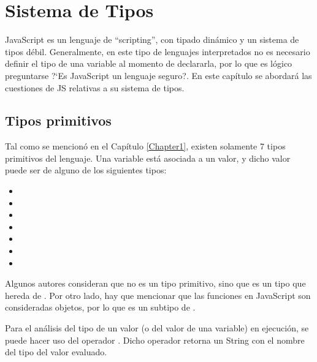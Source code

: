 
\chapter{Sistema de Tipos} %

\label{Chapter2} %


JavaScript es un lenguaje de "`scripting"', con tipado dinámico y un sistema de tipos débil. Generalmente, en este tipo de lenguajes interpretados no es necesario definir el tipo de una variable al momento de declararla, por lo que es lógico preguntarse ?`Es JavaScript un lenguaje seguro?. En este capítulo se abordará las cuestiones de JS relativas a su sistema de tipos.


\section{Tipos primitivos}

Tal como se mencionó en el Capítulo \ref{Chapter1}, existen solamente 7 tipos primitivos del lenguaje. Una variable está asociada a un valor, y dicho valor puede ser de alguno de los siguientes tipos:

\begin{itemize}
\item {}
\item {}
\item {}
\item {}
\item {}
\item {}
\item {}
\end{itemize}

Algunos autores consideran que  no es un tipo primitivo, sino que es un tipo que hereda de . Por otro lado, hay que mencionar que las funciones en JavaScript son consideradas objetos, por lo que  es un subtipo de .

Para el análisis del tipo de un valor (o del valor de una variable) en ejecución, se puede hacer uso del operador . Dicho operador retorna un String con el nombre del tipo del valor evaluado.

